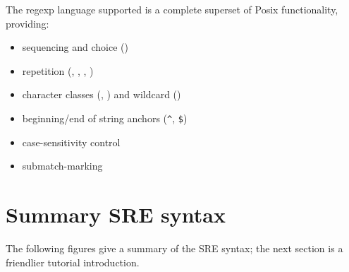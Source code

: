 The regexp language supported is a complete superset of Posix functionality,
providing:
\begin{itemize}
\item sequencing and choice (\ex{|})
\item repetition (\ex{*}, \ex{+}, , )
\item character classes (\eg, \ex{[aeiou]}) and wildcard ()
\item beginning/end of string anchors (\verb|^|, \verb|$|)
\item case-sensitivity control
\item submatch-marking
\end{itemize}


\section{Summary SRE syntax}
The following figures give a summary of the SRE syntax; 
the next section is a friendlier tutorial introduction.

